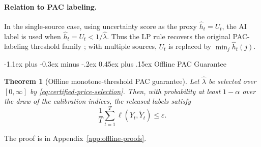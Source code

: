 \documentclass[11pt]{article}
\makeatletter
\renewcommand\subsection{\@startsection{subsection}{2}{\z@}%
  {-1.1ex plus -0.3ex minus -.2ex}%
  {0.45ex plus .15ex}%
  {\normalfont\large\bfseries}}
\newtheorem{theorem}{Theorem}
\newcommand{\hatY}{\widehat Y}
\newcommand{\tildeY}{\widetilde Y}
\newcommand{\hath}{\widehat h}
\newcommand{\hatL}{\widehat L}
\newcommand{\eps}{\varepsilon}
\newcommand{\argmin}{\operatorname*{arg\,min}}
\makeatother
\begin{document}

\paragraph{Relation to PAC labeling.}

In the single-source case, using uncertainty score as the proxy
\(\hath_t=U_t\), the AI label is used when
$\hath_t = U_t < 1/\hat\lambda.$
Thus the LP rule recovers the original PAC-labeling threshold family
\cite{candes2025paclabels}; with multiple sources, \(U_t\) is replaced by
\(\min_j\hath_t(j)\).


\subsection{Offline PAC Guarantee}


\begin{theorem}[Offline monotone-threshold PAC guarantee]
\label{thm:offline-fixed-price-pac}
Let \(\hat\lambda\) be
selected over \([0,\infty]\) by \eqref{eq:certified-price-selection}. Then,
with probability at least \(1-\alpha\) over the draw of the calibration
indices, the released labels satisfy
\begin{equation}
    \frac1T\sum_{t=1}^T \ell(Y_t,\tildeY_t)\le\eps.
    \label{eq:offline-pac-guarantee}
\end{equation}
\end{theorem}
The proof is in Appendix~\ref{app:offline-proofs}.
\end{document}
